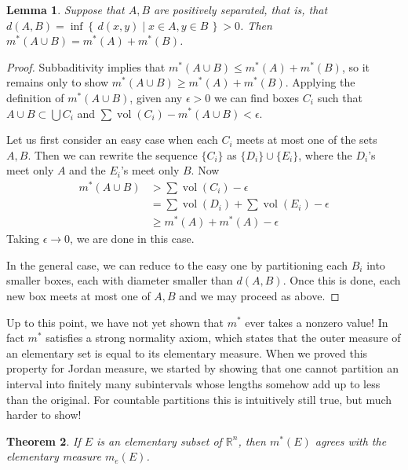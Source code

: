 \documentclass[11pt,oneside]{amsbook}
\newcommand{\set}[1]{\left\{\,#1\,\right\}}
\newcommand{\RR}{{\mathbb R}}
\DeclareMathOperator{\vol}{vol}
\theoremstyle{definition}
\theoremstyle{plain}
\newtheorem{thm}{Theorem}[section]
\newtheorem{lem}[thm]{Lemma}
\theoremstyle{definition}
\theoremstyle{remark}
\numberwithin{equation}{section}
\numberwithin{figure}{section}
\begin{document}

\begin{lem}
  \label{lem:separated}
  Suppose that $A,B$ are positively separated, that is, that $d(A,B)=\inf\set{d(x,y)\mid x\in A, y\in B}>0$. Then $m^*(A\cup B)=m^*(A)+m^*(B)$.
\end{lem}

\begin{proof}
  Subbaditivity implies that $m^*(A\cup B)\leq m^*(A)+m^*(B)$, so it remains only to show $m^*(A\cup B)\geq m^*(A)+m^*(B)$. Applying the definition of $m^*(A\cup B)$, given any $\epsilon>0$ we can find boxes $C_i$ such that $A\cup B\subset\bigcup C_i$ and $\sum\vol(C_i)-m^*(A\cup B)<\epsilon$.

  Let us first consider an easy case when each $C_i$ meets at most one of the sets $A,B$. Then we can rewrite the sequence $\{C_i\}$ as $\{D_i\}\cup\{E_i\}$, where the $D_i$'s meet only $A$ and the $E_i$'s meet only $B$. Now
  \begin{align*}
    m^*(A\cup B)&>\sum\vol(C_i)-\epsilon\\
                &=\sum\vol(D_i)+\sum\vol(E_i)-\epsilon\\
                &\geq m^*(A)+m^*(A)-\epsilon
  \end{align*}
  Taking $\epsilon\to0$, we are done in this case.

  In the general case, we can reduce to the easy one by partitioning each $B_i$ into smaller boxes, each with diameter smaller than $d(A,B)$. Once this is done, each new box meets at most one of $A,B$ and we may proceed as above.
\end{proof}

Up to this point, we have not yet shown that $m^*$ ever takes a nonzero value! In fact $m^*$ satisfies a strong normality axiom, which states that the outer measure of an elementary set is equal to its elementary measure. When we proved this property for Jordan measure, we started by showing that one cannot partition an interval into finitely many subintervals whose lengths somehow add up to less than the original. For countable partitions this is intuitively still true, but much harder to show!

\begin{thm}
  If $E$ is an elementary subset of $\RR^n$, then $m^*(E)$ agrees with the elementary measure $m_e(E)$.
\end{thm}
\end{document}
